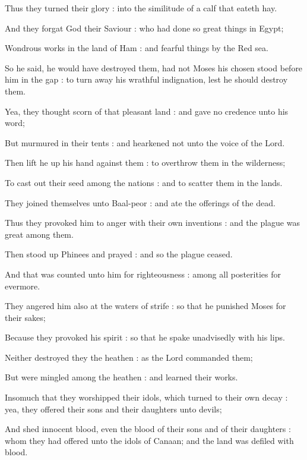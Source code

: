 Thus they turned their glory : into the similitude of a calf that eateth hay.\par
{}And they forgat God their Saviour : who had done so great things in Egypt;\par
{}Wondrous works in the land of Ham : and fearful things by the Red sea.\par
{}So he said, he would have destroyed them, had not Moses his chosen stood before him in the gap : to turn away his wrathful indignation, lest he should destroy them.\par
{}Yea, they thought scorn of that pleasant land : and gave no credence unto his word;\par
{}But murmured in their tents : and hearkened not unto the voice of the Lord.\par
{}Then lift he up his hand against them : to overthrow them in the wilderness;\par
{}To cast out their seed among the nations : and to scatter them in the lands.\par
{}They joined themselves unto Baal-peor : and ate the offerings of the dead.\par
{}Thus they provoked him to anger with their own inventions : and the plague was great among them.\par
{}Then stood up Phinees and prayed : and so the plague ceased.\par
{}And that was counted unto him for righteousness : among all posterities for evermore.\par
{}They angered him also at the waters of strife : so that he punished Moses for their sakes;\par
{}Because they provoked his spirit : so that he spake unadvisedly with his lips.\par
{}Neither destroyed they the heathen : as the Lord commanded them;\par
{}But were mingled among the heathen : and learned their works.\par
{}Insomuch that they worshipped their idols, which turned to their own decay : yea, they offered their sons and their daughters unto devils;\par
{}And shed innocent blood, even the blood of their sons and of their daughters : whom they had offered unto the idols of Canaan; and the land was defiled with blood.\par
